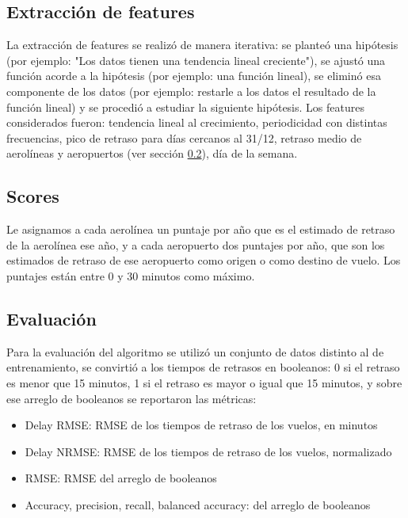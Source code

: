 \subsection{Extracci\'on de features}\label{subsec:extraccion}
La extracci\'on de features se realiz\'o de manera iterativa: se plante\'o una hip\'otesis (por ejemplo:
"Los datos tienen una tendencia lineal creciente"), se ajust\'o una funci\'on acorde a la hip\'otesis
(por ejemplo: una funci\'on lineal), se elimin\'o esa componente de los datos (por ejemplo: restarle a los datos
el resultado de la funci\'on lineal) y se procedi\'o a estudiar la siguiente hip\'otesis.
Los features considerados fueron: tendencia lineal al crecimiento, periodicidad con distintas frecuencias,
pico de retraso para d\'ias cercanos al 31/12, retraso medio de aerol\'ineas y aeropuertos
(ver secci\'on \ref{subsec:scores}), d\'ia de la semana.

\subsection{Scores}\label{subsec:scores}
Le asignamos a cada aerol\'inea un puntaje por a\~no que es el estimado de retraso de la aerol\'inea ese a\~no,
 y a cada aeropuerto dos puntajes por a\~no, que son los estimados de retraso de ese aeropuerto
como origen o como destino de vuelo. Los puntajes est\'an entre 0 y 30 minutos como m\'aximo.

\subsection{Evaluaci\'on}\label{subsec:evaluacion}
Para la evaluaci\'on del algoritmo se utiliz\'o un conjunto de datos distinto al de entrenamiento,
se convirti\'o a los tiempos de retrasos en booleanos: 0 si el retraso es menor que 15 minutos, 1 si el retraso
es mayor o igual que 15 minutos, y sobre ese arreglo de booleanos se reportaron las m\'etricas:
\begin{itemize}
 \item Delay RMSE: RMSE de los tiempos de retraso de los vuelos, en minutos
 \item Delay NRMSE: RMSE de los tiempos de retraso de los vuelos, normalizado
 \item RMSE: RMSE del arreglo de booleanos
 \item Accuracy, precision, recall, balanced accuracy: del arreglo de booleanos
\end{itemize}